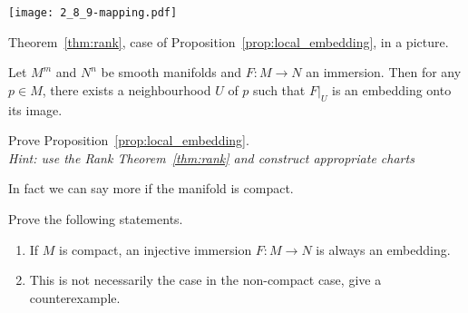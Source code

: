\begin{marginfigure}
  \texttt{[image: 2\_8\_9-mapping.pdf]}
  \caption{Theorem~\ref{thm:rank}, case of Proposition~\ref{prop:local_embedding}, in a picture.}
\end{marginfigure}
\begin{proposition}\label{prop:local_embedding}
  Let $M^m$ and $N^n$ be smooth manifolds and $F:M\to N$ an immersion.
  Then for any $p\in M$, there exists a neighbourhood $U$ of $p$ such that $F\big|_U$ is an embedding onto its image.
\end{proposition}
\begin{exercise}
  Prove Proposition~\ref{prop:local_embedding}. \\
  \textit{\small Hint: use the Rank Theorem~\ref{thm:rank} and construct appropriate charts}
\end{exercise}

In fact we can say more if the manifold is compact.

\begin{exercise}
  Prove the following statements.
  \begin{enumerate}
    \item If $M$ is compact, an injective immersion $F:M\to N$ is always an embedding.
    \item This is not necessarily the case in the non-compact case, give a counterexample.
  \end{enumerate}
\end{exercise}

